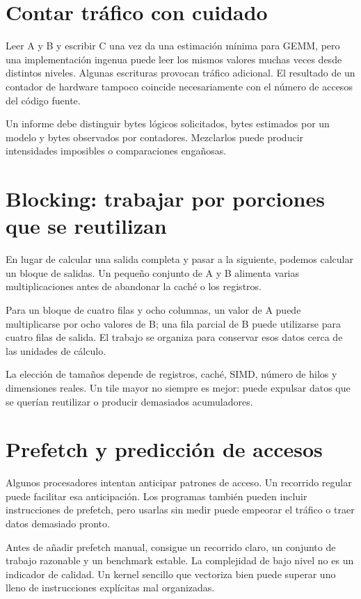 \documentclass[12pt,a4paper,oneside]{report}
\begin{document}
\section{Contar tráfico con cuidado}
Leer A y B y escribir C una vez da una estimación mínima para GEMM, pero una implementación ingenua puede leer los mismos valores muchas veces desde distintos niveles. Algunas escrituras provocan tráfico adicional. El resultado de un contador de hardware tampoco coincide necesariamente con el número de accesos del código fuente.

Un informe debe distinguir bytes lógicos solicitados, bytes estimados por un modelo y bytes observados por contadores. Mezclarlos puede producir intensidades imposibles o comparaciones engañosas.

\section{Blocking: trabajar por porciones que se reutilizan}
En lugar de calcular una salida completa y pasar a la siguiente, podemos calcular un bloque de salidas. Un pequeño conjunto de A y B alimenta varias multiplicaciones antes de abandonar la caché o los registros.

Para un bloque de cuatro filas y ocho columnas, un valor de A puede multiplicarse por ocho valores de B; una fila parcial de B puede utilizarse para cuatro filas de salida. El trabajo se organiza para conservar esos datos cerca de las unidades de cálculo.

La elección de tamaños depende de registros, caché, SIMD, número de hilos y dimensiones reales. Un tile mayor no siempre es mejor: puede expulsar datos que se querían reutilizar o producir demasiados acumuladores.

\section{Prefetch y predicción de accesos}
Algunos procesadores intentan anticipar patrones de acceso. Un recorrido regular puede facilitar esa anticipación. Los programas también pueden incluir instrucciones de prefetch, pero usarlas sin medir puede empeorar el tráfico o traer datos demasiado pronto.

Antes de añadir prefetch manual, consigue un recorrido claro, un conjunto de trabajo razonable y un benchmark estable. La complejidad de bajo nivel no es un indicador de calidad. Un kernel sencillo que vectoriza bien puede superar uno lleno de instrucciones explícitas mal organizadas.
\end{document}
